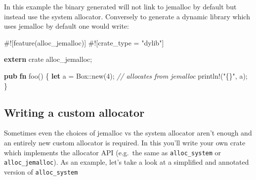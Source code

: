 \documentclass[a4paper,]{book}
\newenvironment{Shaded}{\begin{snugshade}}{\end{snugshade}}
\newcommand{\KeywordTok}[1]{\textcolor[rgb]{0.13,0.29,0.53}{\textbf{{#1}}}}
\newcommand{\DecValTok}[1]{\textcolor[rgb]{0.00,0.00,0.81}{{#1}}}
\newcommand{\StringTok}[1]{\textcolor[rgb]{0.31,0.60,0.02}{{#1}}}
\newcommand{\CommentTok}[1]{\textcolor[rgb]{0.56,0.35,0.01}{\textit{{#1}}}}
\newcommand{\OtherTok}[1]{\textcolor[rgb]{0.56,0.35,0.01}{{#1}}}
\newcommand{\NormalTok}[1]{{#1}}
\begin{document}
In this example the binary generated will not link to jemalloc by
default but instead use the system allocator. Conversely to generate a
dynamic library which uses jemalloc by default one would write:

\begin{Shaded}
\begin{Highlighting}[]
\NormalTok{#![feature(alloc_jemalloc)]}
\NormalTok{#![crate_type = }\StringTok{"dylib"}\NormalTok{]}

\KeywordTok{extern} \NormalTok{crate alloc_jemalloc;}

\KeywordTok{pub} \KeywordTok{fn} \NormalTok{foo() \{}
    \KeywordTok{let} \NormalTok{a = Box::new(}\DecValTok{4}\NormalTok{); }\CommentTok{// allocates from jemalloc}
    \OtherTok{println!}\NormalTok{(}\StringTok{"\{\}"}\NormalTok{, a);}
\NormalTok{\}}
\end{Highlighting}
\end{Shaded}

\subsection{Writing a custom
allocator}\label{writing-a-custom-allocator}

Sometimes even the choices of jemalloc vs the system allocator aren't
enough and an entirely new custom allocator is required. In this you'll
write your own crate which implements the allocator API (e.g.~the same
as \texttt{alloc\_system} or \texttt{alloc\_jemalloc}). As an example,
let's take a look at a simplified and annotated version of
\texttt{alloc\_system}
\end{document}
